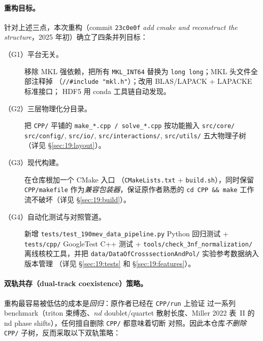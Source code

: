 \paragraph{重构目标。}
针对上述三点，本次重构（commit \texttt{23c0e0f} \emph{add cmake and reconstruct
the structure}，2025 年初）确立了四条并列目标：

\begin{description}
\item[（G1）平台无关。] 移除 MKL 强依赖，把所有
      \texttt{MKL\_INT64} 替换为 \texttt{long long}；MKL 头文件全部注释掉
      （\texttt{//\#include "mkl.h"}）；改用 BLAS/LAPACK + LAPACKE 标准接口；
      HDF5 用 conda 工具链自动发现。
\item[（G2）三层物理化分目录。] 把 \texttt{CPP/} 平铺的
      \texttt{make\_*.cpp / solve\_*.cpp} 按功能搬入 \texttt{src/core/}
      \texttt{src/config/}, \texttt{src/io/}, \texttt{src/interactions/},
      \texttt{src/utils/} 五大物理子树（详见 §\ref{sec:19:layout}）。
\item[（G3）现代构建。] 在仓库根加一个 CMake 入口
      （\texttt{CMakeLists.txt} + \texttt{build.sh}），同时保留
      \texttt{CPP/makefile} 作为\emph{兼容包装器}，保证原作者熟悉的
      \texttt{cd CPP \&\& make} 工作流不破坏（详见 §\ref{sec:19:build}）。
\item[（G4）自动化测试与对照管道。] 新增
      \texttt{tests/test\_190mev\_data\_pipeline.py} Python 回归测试 +
      \texttt{tests/cpp/} GoogleTest C++ 测试 +
      \texttt{tools/check\_3nf\_normalization/} 离线核校工具，并把
      \texttt{data/DataOfCrosssectionAndPol/} 实验参考数据纳入版本管理
      （详见 §\ref{sec:19:tests} 和 §\ref{sec:19:features}）。
\end{description}

\paragraph{双轨共存（dual-track coexistence）策略。}
重构最容易被低估的成本是\emph{回归}：原作者已经在 \texttt{CPP/run} 上验证
过一系列 benchmark（triton 束缚态、$nd$ doublet/quartet 散射长度、Miller
2022 表~II 的 nd phase shifts），任何擅自删除 \texttt{CPP/} 都意味着切断
对照。因此本仓库\emph{不删除} \texttt{CPP/} 子树，反而采取以下双轨策略：

